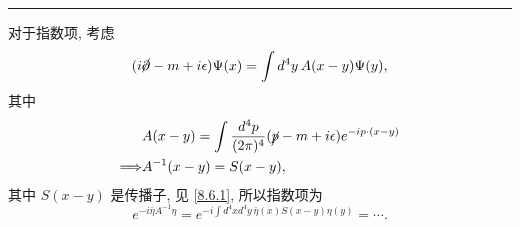 \begin{itemize}
\begin{tcolorbox}[title=calculation:]
		\noindent\rule[0.5ex]{\linewidth}{0.5pt} %
		
		对于指数项, 考虑
		\begin{equation}
			(i \cancel{\partial} - m + i \epsilon) \Psi(x) = \int d^4 y \, A(x - y) \Psi(y),
		\end{equation}
		其中
		\begin{align}
			& A(x - y) = \int \frac{d^4 p}{(2 \pi)^4} (\cancel{p} - m + i \epsilon) e^{- i p \cdot (x - y)} \notag \\
			\Longrightarrow & A^{- 1}(x - y) = S(x - y),
		\end{align}
		其中 $S(x - y)$ 是传播子, 见 \eqref{8.6.1}, 所以指数项为
		\begin{equation}
			e^{- i \bar{\eta} A^{- 1} \eta} = e^{- i \int d^4 x d^4 y \, \bar{\eta}(x) S(x - y) \eta(y)} = \cdots.
		\end{equation}
	\end{tcolorbox}
\end{itemize}

